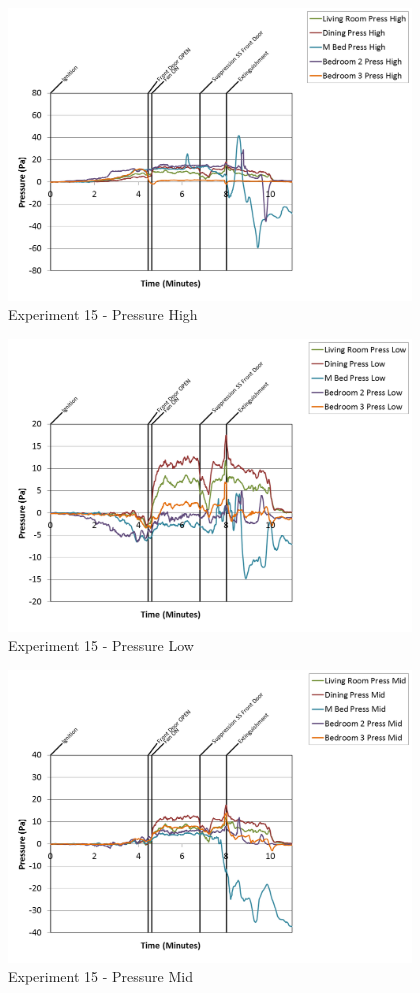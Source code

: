 \documentclass{article}
\begin{document}
\begin{appendices}
\begin{figure}[h!]
	\centering
	\includegraphics[height=3.05in]{0_Images/Results_Charts/Exp_15_Charts/PressureHigh.png}
	\caption{Experiment 15 - Pressure High}
\end{figure}

\clearpage

\begin{figure}[h!]
	\centering
	\includegraphics[height=3.05in]{0_Images/Results_Charts/Exp_15_Charts/PressureLow.png}
	\caption{Experiment 15 - Pressure Low}
\end{figure}


\begin{figure}[h!]
	\centering
	\includegraphics[height=3.05in]{0_Images/Results_Charts/Exp_15_Charts/PressureMid.png}
	\caption{Experiment 15 - Pressure Mid}
\end{figure}


\end{appendices}
\end{document}
